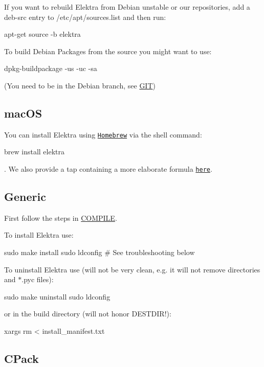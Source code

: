 If you want to rebuild Elektra from Debian unstable or our repositories, add a {\ttfamily deb-\/src} entry to {\ttfamily /etc/apt/sources.list} and then run\+: \begin{DoxyVerb}apt-get source -b elektra
\end{DoxyVerb}


To build Debian Packages from the source you might want to use\+: \begin{DoxyVerb}dpkg-buildpackage -us -uc -sa
\end{DoxyVerb}


(You need to be in the Debian branch, see \hyperlink{doc_GIT_md}{G\+IT})

\subsection*{mac\+OS}

You can install Elektra using \href{http://brew.sh}{\tt Homebrew} via the shell command\+:


\begin{DoxyCode}
brew install elektra
\end{DoxyCode}


. We also provide a tap containing a more elaborate formula \href{http://github.com/ElektraInitiative/homebrew-elektra}{\tt here}.

\subsection*{Generic}

First follow the steps in \hyperlink{doc_COMPILE_md}{C\+O\+M\+P\+I\+LE}.

To install Elektra use\+: \begin{DoxyVerb}sudo make install
sudo ldconfig  # See troubleshooting below
\end{DoxyVerb}


To uninstall Elektra use (will not be very clean, e.\+g. it will not remove directories and {\ttfamily $\ast$.pyc} files)\+: \begin{DoxyVerb}sudo make uninstall
sudo ldconfig
\end{DoxyVerb}


or in the build directory (will not honor D\+E\+S\+T\+D\+I\+R!)\+: \begin{DoxyVerb}xargs rm < install_manifest.txt
\end{DoxyVerb}


\subsection*{C\+Pack}

